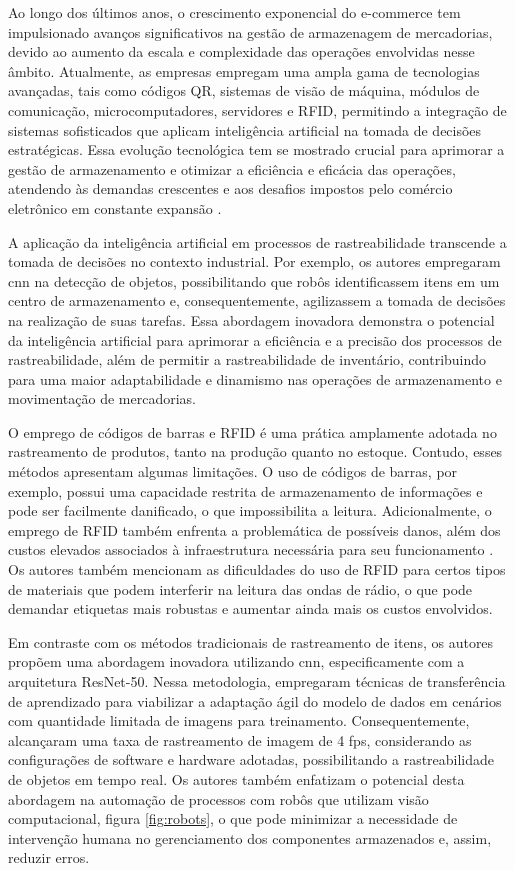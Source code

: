 Ao longo dos últimos anos, o crescimento exponencial do e-commerce tem impulsionado avanços significativos na gestão de armazenagem de mercadorias, devido ao aumento da escala e complexidade das operações envolvidas nesse âmbito. Atualmente, as empresas empregam uma ampla gama de tecnologias avançadas, tais como códigos QR, sistemas de visão de máquina, módulos de comunicação, microcomputadores, servidores e RFID, permitindo a integração de sistemas sofisticados que aplicam inteligência artificial na tomada de decisões estratégicas. Essa evolução tecnológica tem se mostrado crucial para aprimorar a gestão de armazenamento e otimizar a eficiência e eficácia das operações, atendendo às demandas crescentes e aos desafios impostos pelo comércio eletrônico em constante expansão \cite{Hristov2022}.


A aplicação da inteligência artificial em processos de rastreabilidade transcende a tomada de decisões no contexto industrial. Por exemplo, os autores \textcite{Hristov2022} empregaram \acrfull{cnn} na detecção de objetos, possibilitando que robôs identificassem itens em um centro de armazenamento e, consequentemente, agilizassem a tomada de decisões na realização de suas tarefas. Essa abordagem inovadora demonstra o potencial da inteligência artificial para aprimorar a eficiência e a precisão dos processos de rastreabilidade, além de permitir a rastreabilidade de inventário, contribuindo para uma maior adaptabilidade e dinamismo nas operações de armazenamento e movimentação de mercadorias.


O emprego de códigos de barras e RFID é uma prática amplamente adotada no rastreamento de produtos, tanto na produção quanto no estoque. Contudo, esses métodos apresentam algumas limitações. O uso de códigos de barras, por exemplo, possui uma capacidade restrita de armazenamento de informações e pode ser facilmente danificado, o que impossibilita a leitura. Adicionalmente, o emprego de RFID também enfrenta a problemática de possíveis danos, além dos custos elevados associados à infraestrutura necessária para seu funcionamento \cite{Pihir2011}. Os autores \textcite{Elisabeth2011} também mencionam as dificuldades do uso de RFID para certos tipos de materiais que podem interferir na leitura das ondas de rádio, o que pode demandar etiquetas mais robustas e aumentar ainda mais os custos envolvidos.


Em contraste com os métodos tradicionais de rastreamento de itens, os autores \textcite{Patel2020} propõem uma abordagem inovadora utilizando \acrshort{cnn}, especificamente com a arquitetura ResNet-50. Nessa metodologia, empregaram técnicas de transferência de aprendizado para viabilizar a adaptação ágil do modelo de dados em cenários com quantidade limitada de imagens para treinamento. Consequentemente, alcançaram uma taxa de rastreamento de imagem de 4 \acrfull{fps}, considerando as configurações de software e hardware adotadas, possibilitando a rastreabilidade de objetos em tempo real. Os autores também enfatizam o potencial desta abordagem na automação de processos com robôs que utilizam visão computacional, figura \ref{fig:robots}, o que pode minimizar a necessidade de intervenção humana no gerenciamento dos componentes armazenados e, assim, reduzir erros.


